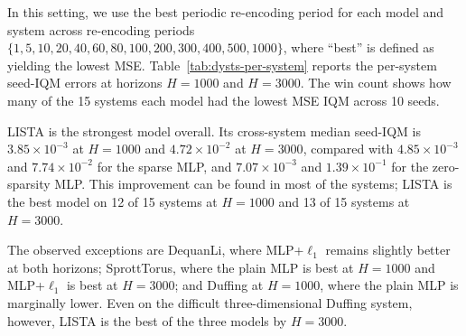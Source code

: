 In this setting, we use the best periodic re-encoding period for each model and system across re-encoding periods $\{1, 5, 10, 20, 40, 60, 80, 100, 200, 300, 400, 500, 1000\}$, where ``best'' is defined as yielding the lowest MSE. Table~\ref{tab:dysts-per-system} reports the per-system seed-IQM errors at horizons $H=1000$ and $H=3000$. The win count shows how many of the 15 systems each model had the lowest MSE IQM across 10 seeds.

LISTA is the strongest model overall. Its cross-system median seed-IQM is $3.85\times 10^{-3}$ at $H=1000$ and $4.72\times 10^{-2}$ at $H=3000$, compared with $4.85\times 10^{-3}$ and $7.74\times 10^{-2}$ for the sparse MLP, and $7.07\times 10^{-3}$ and $1.39\times 10^{-1}$ for the zero-sparsity MLP. This improvement can be found in most of the systems; LISTA is the best model on 12 of 15 systems at $H=1000$ and 13 of 15 systems at $H=3000$.

The observed exceptions are DequanLi, where MLP+$\ell_1$ remains slightly better at both horizons; SprottTorus, where the plain MLP is best at $H=1000$ and MLP+$\ell_1$ is best at $H=3000$; and Duffing at $H=1000$, where the plain MLP is marginally lower. Even on the difficult three-dimensional Duffing system, however, LISTA is the best of the three models by $H=3000$.

